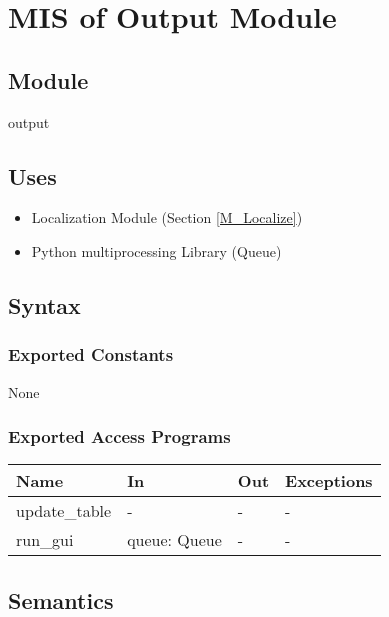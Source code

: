 \documentclass[12pt, titlepage]{article}
\begin{document}

\newpage

\section{MIS of Output Module} \label{M_Output} 
\subsection{Module}

output

\subsection{Uses}
\begin{itemize}
  \item Localization Module (Section \ref{M_Localize})
  \item Python multiprocessing Library (Queue)
\end{itemize}

\subsection{Syntax}

\subsubsection{Exported Constants}
None

\subsubsection{Exported Access Programs}

\begin{center}
\begin{tabular}{p{4cm} p{4cm} p{4cm} p{2cm}}
\hline
\textbf{Name} & \textbf{In} & \textbf{Out} & \textbf{Exceptions} \\
\hline
update\_table & - & - & - \\
run\_gui & queue: Queue & - & - \\
\hline
\end{tabular}
\end{center}

\subsection{Semantics}
\end{document}
